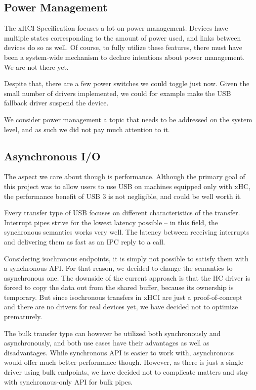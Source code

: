 \subsection{Power Management}

The xHCI Specification focuses a lot on power management. Devices have multiple
states corresponding to the amount of power used, and links between devices
do so as well. Of course, to fully utilize these features, there must have been
a system-wide mechanism to declare intentions about power management. We are not
there yet.

Despite that, there are a few power switches we could toggle just now. Given the
small number of drivers implemented, we could for example make the USB fallback
driver suspend the device.

We consider power management a topic that needs to be addressed on the
system level, and as such we did not pay much attention to it.

\subsection{Asynchronous I/O}

The aspect we care about though is performance. Although the primary goal of
this project was to allow users to use USB on machines equipped only with xHC,
the performance benefit of USB 3 is not negligible, and could be well worth it.

Every transfer type of USB focuses on different characteristics of the
transfer. Interrupt pipes strive for the lowest latency possible -- in this
field, the synchronous semantics works very well. The latency between receiving
interrupts and delivering them as fast as an IPC reply to a call.

Considering isochronous endpoints, it is simply not possible to satisfy them
with a synchronous API. For that reason, we decided to change the semantics to asynchronous
one. The downside of the current approach is that the HC driver is forced to
copy the data out from the shared buffer, because its ownership is temporary.
But since isochronous transfers in xHCI are just a proof-of-concept and
there are no drivers for real devices yet, we have decided not to optimize
prematurely.

The bulk transfer type can however be utilized both synchronously and
asynchronously, and both use cases have their advantages as well as disadvantages. While synchronous API is easier to
work with, asynchronous would offer much better performance though. However, as there is just
a single driver using bulk endpoints, we have decided not to complicate matters and stay
with synchronous-only API for bulk pipes.

